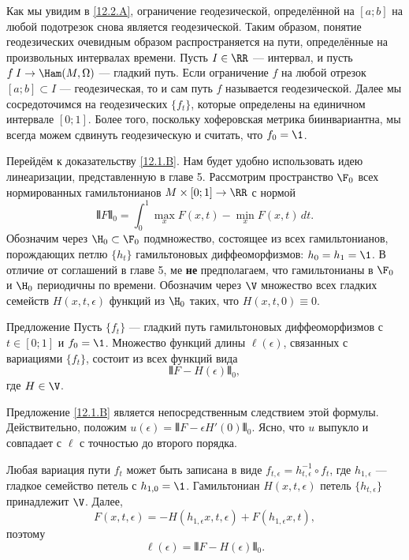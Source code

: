Как мы увидим в \ref{12.2.A}, ограничение геодезической, определённой на $[a; b]$ на любой подотрезок снова является геодезической.
Таким образом, понятие геодезических очевидным образом распространяется на пути, определённые на произвольных интервалах времени.
Пусть $I\in \RR$ --- интервал, и пусть $f\: I\to\Ham(M,\Omega)$ --- гладкий путь.
Если ограничение $f$ на любой отрезок $[a; b] \subset I$ --- геодезическая, то и сам путь $f$ называется геодезической.
Далее мы сосредоточимся на геодезических $\{f_t\}$, которые определены на единичном интервале $[0; 1]$.
Более того, поскольку хоферовская метрика биинвариантна, мы всегда можем сдвинуть геодезическую и считать, что $f_0 = \1$. 

Перейдём к доказательству \ref{12.1.B}.
Нам будет удобно использовать идею линеаризации, представленную в главе 5.
Рассмотрим пространство $\F_0$ всех нормированных гамильтонианов $M \times [0; 1] \to \RR$
с нормой
\[\VERT F \VERT_0 = \int_0^1 \max_x F(x,t) - \min_x F(x,t)\, dt.\]
Обозначим через $\H_0 \subset \F_0$ подмножество, состоящее из всех гамильтонианов, порождающих петлю $\{h_t\}$ гамильтоновых диффеоморфизмов: $h_0 = h_1 = \1$.
В отличие от соглашений в главе 5,
ме \textbf{не} предполагаем, что гамильтонианы в $\F_0$ и $\H_0$ периодичны по времени.
Обозначим через $\V$ множество всех гладких семейств $H(x, t, \epsilon)$ функций из $\H_0$ таких, что $H(x, t, 0) \equiv 0$.

\begin{thm}{Предложение}\label{12.1.E}
Пусть $\{f_t\}$ --- гладкий путь гамильтоновых диффеоморфизмов с $t \in [0; 1]$ и $f_0 = \1$.
Множество функций длины $\ell(\epsilon)$, связанных с вариациями $\{f_t\}$, состоит из всех функций вида 
\[\VERT F - H(\epsilon)\VERT_0,\]
где $H\in\V$.
\end{thm}

Предложение \ref{12.1.B} является непосредственным следствием этой формулы.
Действительно, положим $u(\epsilon) = \VERT F - \epsilon H'(0)\VERT_0$.
Ясно, что $u$ выпукло и совпадает с $\ell$ с точностью до второго порядка.

Любая вариация пути $f_t$ может быть записана в виде $f_{t,\epsilon} = h_{t,\epsilon}^{-1}\circ f_t$, где $h_{1,\epsilon}$ --- гладкое семейство петель с $h_{1,0} = \1$.
Гамильтониан $H(x,t,\epsilon)$ петель $\{h_{t,\epsilon}\}$ принадлежит $\V$.
Далее, 
\[F(x, t, \epsilon) = -H(h_{1,\epsilon}x, t, \epsilon) + F(h_{1,\epsilon}x, t),\]
поэтому
\[\ell(\epsilon) = \VERT F - H(\epsilon)\VERT_0.\]
\qeds

